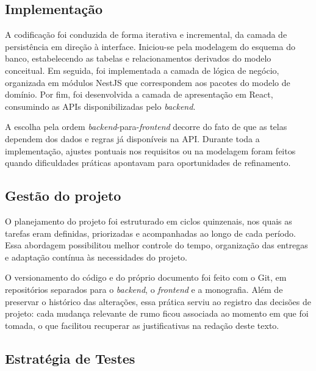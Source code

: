 \subsection{Implementação}

A codificação foi conduzida de forma iterativa e incremental, da camada de persistência em direção à interface. Iniciou-se pela modelagem do esquema do banco, estabelecendo as tabelas e relacionamentos derivados do modelo conceitual. Em seguida, foi implementada a camada de lógica de negócio, organizada em módulos NestJS que correspondem aos pacotes do modelo de domínio. Por fim, foi desenvolvida a camada de apresentação em React, consumindo as APIs disponibilizadas pelo \textit{backend}.

A escolha pela ordem \textit{backend}-para-\textit{frontend} decorre do fato de que as telas dependem dos dados e regras já disponíveis na API. Durante toda a implementação, ajustes pontuais nos requisitos ou na modelagem foram feitos quando dificuldades práticas apontavam para oportunidades de refinamento.

\subsection{Gestão do projeto}

O planejamento do projeto foi estruturado em ciclos quinzenais, nos quais as tarefas eram definidas, priorizadas e acompanhadas ao longo de cada período. Essa abordagem possibilitou melhor controle do tempo, organização das entregas e adaptação contínua às necessidades do projeto.

O versionamento do código e do próprio documento foi feito com o Git, em repositórios separados para o \textit{backend}, o \textit{frontend} e a monografia. Além de preservar o histórico das alterações, essa prática serviu ao registro das decisões de projeto: cada mudança relevante de rumo ficou associada ao momento em que foi tomada, o que facilitou recuperar as justificativas na redação deste texto.

\subsection{Estratégia de Testes}

